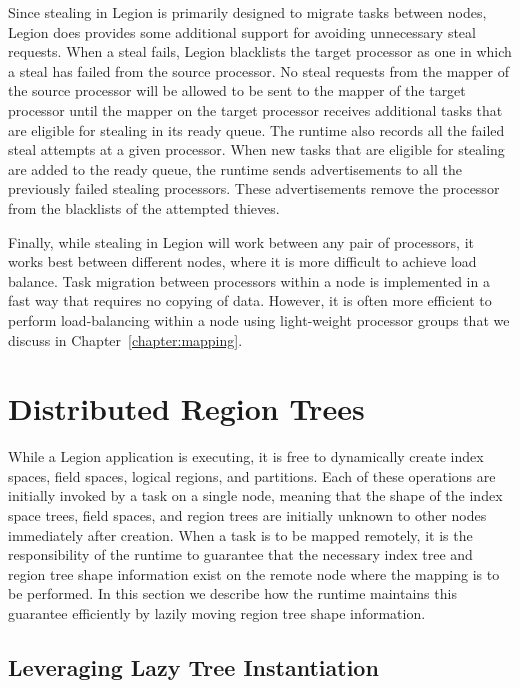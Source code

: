 Since stealing in Legion is primarily designed
to migrate tasks between nodes, Legion does
provides some additional support for avoiding
unnecessary steal requests.  When a steal fails,
Legion blacklists the target processor as one in 
which a steal has failed from the source processor.
No steal requests from the mapper of the source
processor will be allowed to be sent to the mapper 
of the target processor until the mapper on the target 
processor receives additional tasks that are
eligible for stealing in its ready queue.  The
runtime also records all the failed steal attempts
at a given processor.  When new tasks that are
eligible for stealing are added to the ready
queue, the runtime sends advertisements to all the
previously failed stealing processors.  These
advertisements remove the processor from the
blacklists of the attempted thieves.

Finally, while stealing in Legion will work between
any pair of processors, it works best between
different nodes, where it is more difficult
to achieve load balance. Task migration between
processors within a node is implemented in a fast
way that requires no copying of data.  However,
it is often more efficient to perform load-balancing
within a node using light-weight processor groups
that we discuss in Chapter~\ref{chapter:mapping}.

\section{Distributed Region Trees}
\label{sec:distshape}
While a Legion application is executing, it is 
free to dynamically create index spaces, 
field spaces, logical regions, and partitions. Each
of these operations are initially invoked by
a task on a single node, meaning that the
shape of the index space trees, field spaces, and
region trees are initially unknown to other nodes
immediately after creation. When a task is to be 
mapped remotely, it is the responsibility of the 
runtime to guarantee that the necessary index tree
and region tree shape information exist on the remote 
node where the mapping is to be performed. In this section 
we describe how the runtime maintains this 
guarantee efficiently by lazily moving region
tree shape information.

\subsection{Leveraging Lazy Tree Instantiation}
\label{subsec:lazytree}

